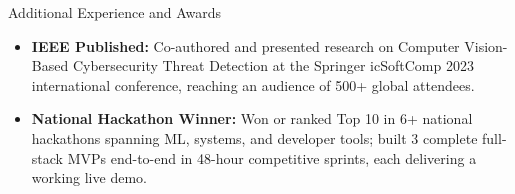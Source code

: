 \documentclass[]{mcdowellcv}
\begin{document}
\begin{cvsection}{Additional Experience and Awards}
  \begin{cvsubsection}{}{}{}
    \begin{itemize}
      \item \textbf{IEEE Published:} Co-authored and presented research on Computer Vision-Based Cybersecurity Threat Detection at the Springer icSoftComp 2023 international conference, reaching an audience of 500+ global attendees.
      \item \textbf{National Hackathon Winner:} Won or ranked Top 10 in 6+ national hackathons spanning ML, systems, and developer tools; built 3 complete full-stack MVPs end-to-end in 48-hour competitive sprints, each delivering a working live demo.
    \end{itemize}
  \end{cvsubsection}
\end{cvsection}
\end{document}
